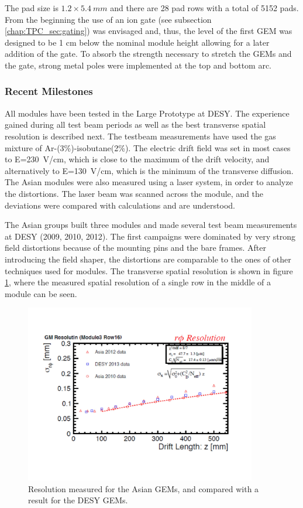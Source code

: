 The pad size is $1.2 \times \SI{5.4}{mm}$ and there are 28 pad rows with a total of 5152 pads.
From the beginning the use of an ion gate
(see subsection \ref{chap:TPC_sec:gating}) was envisaged and, thus, the level of the first GEM was designed
to be 1 cm below the nominal module height allowing for a later addition of the gate. To absorb the strength necessary
to stretch the GEMs and the gate, strong metal poles were implemented at the top and bottom arc.

\subsubsection{Recent Milestones}

All modules have been tested in the Large Prototype at DESY. The experience gained during all test beam periods as
well as the best transverse spatial resolution is described next. The testbeam measurements have used
the gas mixture of Ar-(3\%)-isobutane(2\%). The electric drift field was set in most cases to
E=\SI{230}{V/cm}, which is close to the maximum of the drift velocity, and alternatively to
E=\SI{130}{V/cm}, which is the minimum of the transverse diffusion.
The Asian modules were also measured using a laser system, in order to analyze the distortions.
The laser beam was scanned across the module, and the deviations were compared with calculations and are understood.

The Asian groups built three modules and made several test beam measurements at DESY (2009, 2010, 2012).
The first campaigns were dominated by very strong field distortions because of the mounting pins and the bare frames.
After introducing the field shaper, the distortions are comparable to the ones of other techniques used for modules.
The transverse spatial resolution is shown in figure \ref{fig_Fig2asiangemresolution}, where the measured spatial
resolution of a single row in the middle of a module can be seen.

\begin{figure}[!htb]
  \centering
  \includegraphics[width=0.9\textwidth]{Tracker/TPC_Bonn/plots/TPC-AG_Fig2asiangemresolution.pdf}
  \caption{Resolution measured for the Asian GEMs, and compared with a result for the DESY GEMs.}
  \label{fig_Fig2asiangemresolution}
\end{figure}

